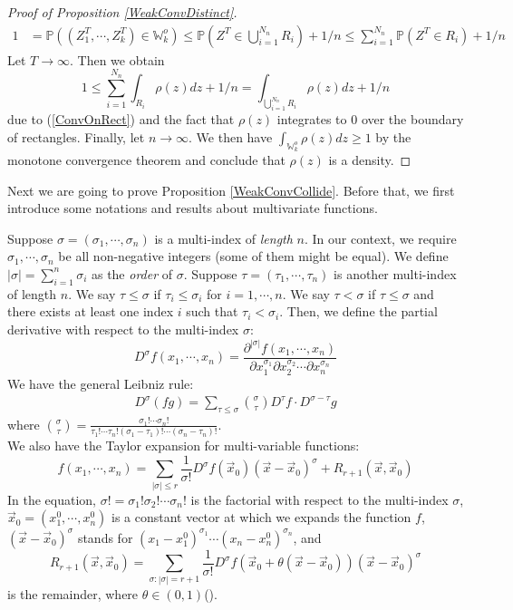 \begin{proof}[Proof of Proposition \ref{WeakConvDistinct}]
\begin{align*}
	1&=\mathbb{P}((Z_{1}^{T},\cdots,Z_{k}^{T})\in \mathbb{W}_{k}^{o})\leq \mathbb{P}(Z^{T}\in\bigcup_{i=1}^{N_{n}}R_{i})+1/n \leq \sum_{i=1}^{N_{n}}\mathbb{P}(Z^{T}\in R_{i})+1/n
\end{align*}
Let $T\rightarrow\infty$. Then we obtain
$$1\leq \sum_{i=1}^{N_{n}}\int_{R_{i}}\rho(z)dz+1/n=\int_{\bigcup_{i=1}^{N_{n}}R_{i}}\rho(z)dz+1/n$$
due to (\ref{ConvOnRect}) and the fact that $\rho(z)$ integrates to $0$ over the boundary of rectangles. Finally, let $n\rightarrow\infty$. We then have $\int_{\mathbb{W}_{k}^{o}}\rho(z)dz\geq 1$ by the monotone convergence theorem and conclude that $\rho(z)$ is a density.
\end{proof}

Next we are going to prove Proposition \ref{WeakConvCollide}. Before that, we first introduce some notations and results about multivariate functions.

Suppose $\sigma = (\sigma_{1},\cdots,\sigma_{n})$ is a multi-index of \emph{length} $n$. In our context, we require $\sigma_{1},\cdots,\sigma_{n}$ be all non-negative integers (some of them might be equal). We define $|\sigma|=\sum_{i=1}^{n}\sigma_{i}$ as the \emph{order} of $\sigma$. Suppose $\tau=(\tau_{1},\cdots,\tau_{n})$ is another multi-index of length $n$. We say $\tau\leqslant \sigma$ if $\tau_{i}\leqslant \sigma_{i}$ for $i=1,\cdots,n$. We say $\tau<\sigma$ if $\tau\leqslant \sigma$ and there exists at least one index $i$ such that $\tau_{i}<\sigma_{i}$. Then, we define the partial derivative with respect to the multi-index $\sigma$:
$$D^{\sigma}f(x_{1},\cdots,x_{n})=\frac{\partial^{|\sigma|}f(x_{1},\cdots,x_{n})}{\partial x_{1}^{\sigma_{1}}\partial x_{2}^{\sigma_{2}}\cdots \partial x_{n}^{\sigma_{n}}}$$ We have the general Leibniz rule:
\begin{align*}
	D^{\sigma}(fg)=\sum_{\tau\leqslant\sigma}\binom{\sigma}{\tau}D^{\tau}f\cdot D^{\sigma-\tau}g
\end{align*}
where $\binom{\sigma}{\tau}=\frac{\sigma_{1}!\cdots\sigma_{n}!}{\tau_{1}!\cdots\tau_{n}!(\sigma_{1}-\tau_{1})!\cdots(\sigma_{n}-\tau_{n})!}$.\\
We also have the Taylor expansion for multi-variable functions:
$$f(x_{1},\cdots,x_{n})=\sum_{|\sigma|\leqslant r}\frac{1}{\sigma!}D^{\sigma}f(\vec{x}_{0})(\vec{x}-\vec{x}_{0})^{\sigma}+R_{r+1}(\vec{x},\vec{x}_{0})$$ 
In the equation, $\sigma!=\sigma_{1}!\sigma_{2}!\cdots\sigma_{n}!$ is the factorial with respect to the multi-index $\sigma$, $\vec{x}_{0}=(x_{1}^{0},\cdots,x_{n}^{0})$ is a constant vector at which we expands the function $f$, $(\vec{x}-\vec{x}_{0})^{\sigma}$ stands for $(x_{1}-x_{1}^{0})^{\sigma_{1}}\cdots(x_{n}-x_{n}^{0})^{\sigma_{n}}$, and $$R_{r+1}(\vec{x},\vec{x}_{0})=\sum_{\sigma:|\sigma|=r+1}\frac{1}{\sigma!}D^{\sigma}f(\vec{x}_{0}+\theta(\vec{x}-\vec{x}_{0}))(\vec{x}-\vec{x}_{0})^{\sigma}$$ is the remainder, where $\theta\in (0,1)$(\cite[Theorem 3.18 \& Corollary 3.19]{CJ}).

